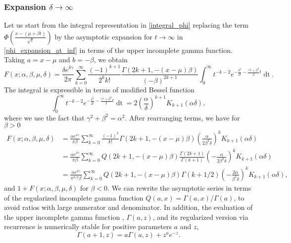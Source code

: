 \documentclass[10pt,a4paper,oneside]{article}
\numberwithin{equation}{section}
\begin{document}
\subsubsection{Expansion $\delta \to \infty$}
Let us start from the integral representation in \eqref{integral_phi} replacing the term $\Phi\left(\frac{x-(\mu + \beta t)}{\sqrt{t}}\right)$ by the asymptotic expansion for $t\to \infty$ in \eqref{phi_expansion_at_inf} in terms of the upper incomplete gamma function. Taking $a = x -\mu$ and $b = -\beta$, we obtain
\begin{equation}
F(x; \alpha, \beta, \mu, \delta) = \frac{\delta e^{\delta \gamma}}{2\pi} \sum_{k=0}^{\infty}\frac{(-1)^{k+1}}{2^k k!} \frac{\Gamma(2k+1, -(x-\mu)\beta)}{(-\beta)^{2k+1}} \int_0^{\infty} t^{-k-2} e^{-\frac{\delta^2}{2t} - \frac{\gamma^2 + \beta^2}{2}t} \mathop{dt}.
\end{equation}
The integral is expressible in terms of modified Bessel function
\begin{equation}
\int_0^{\infty} t^{-k-2} e^{-\frac{\delta^2}{2t} - \frac{\gamma^2 + \beta^2}{2}t} \mathop{dt} = 2 \left(\frac{\alpha}{\delta}\right)^{k + 1} K_{k+1}(\alpha \delta),
\end{equation}
where we use the fact that $\gamma^2+ \beta^2 = \alpha^2$. After rearranging terms, we have for $\beta > 0$
\begin{align}\label{general_asymptotic_delta}
F(x; \alpha, \beta, \mu, \delta) &= \frac{\alpha e^{\delta \gamma}}{\pi \beta}\sum_{k=0}^{\infty} \frac{(-1)^k}{k!} \Gamma(2k + 1, -(x-\mu)\beta)\left(\frac{\alpha}{2\beta^2 \delta}\right)^k K_{k+1}(\alpha \delta)\\
 &=\frac{\alpha e^{\delta \gamma}}{\pi \beta}\sum_{k=0}^{\infty} Q(2k + 1, -(x-\mu)\beta)\frac{\Gamma(2k+1)}{\Gamma(k+1)}\left(-\frac{\alpha}{2\beta^2 \delta}\right)^k K_{k+1}(\alpha \delta)\\
 &=\frac{\alpha e^{\delta \gamma}}{\pi^{3/2} \beta}\sum_{k=0}^{\infty} Q(2k + 1, -(x-\mu)\beta) \Gamma(k + 1/2)\left(-\frac{2\alpha}{\beta^2 \delta}\right)^k K_{k+1}(\alpha \delta),
\end{align}
and $1 + F(x; \alpha, \beta, \mu, \delta)$ for $\beta < 0$. We can rewrite the asymptotic series in terms of the regularized incomplete gamma function $Q(a, x) = \Gamma(a, x)/\Gamma(a)$, to avoid ratios with large numerator and denominator. In addition, the evaluation of the upper incomplete gamma function , $\Gamma(a, z)$, and its regularized version via recurrence is numerically stable for positive parameters $a$ and $z$,
\begin{equation}
\Gamma(a + 1, z) = a \Gamma(a, z) + z^a e^{-z}.
\end{equation}
\end{document}
